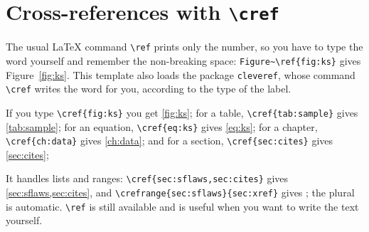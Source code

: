 \section{Cross-references with \texttt{\textbackslash cref}}\label{sec:xref}


The usual LaTeX command \verb|\ref| prints only the number, so you have to type the word yourself and remember the non-breaking space: \verb|Figure~\ref{fig:ks}| gives Figure~\ref{fig:ks}. This template also loads the package \texttt{cleveref}, whose command \verb|\cref| writes the word for you, according to the type of the label.

If you type \verb|\cref{fig:ks}| you get \cref{fig:ks}; for a table, \verb|\cref{tab:sample}| gives \cref{tab:sample}; for an equation, \verb|\cref{eq:ks}| gives \cref{eq:ks}; for a chapter, \verb|\cref{ch:data}| gives \cref{ch:data}; and for a section, \verb|\cref{sec:cites}| gives \cref{sec:cites};

It handles lists and ranges: \verb|\cref{sec:sflaws,sec:cites}| gives \cref{sec:sflaws,sec:cites}, and \verb|\crefrange{sec:sflaws}{sec:xref}| gives ; the plural is automatic.
\verb|\ref| is still available and is useful when you want to write the text yourself.



